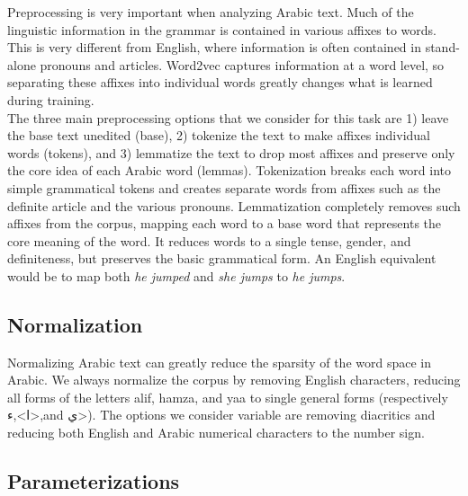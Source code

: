 Preprocessing is very important when analyzing Arabic text. Much of the linguistic information in the grammar is contained in various affixes to words. This is very different from English, where information is often contained in stand-alone pronouns and articles. Word2vec captures information at a word level, so separating these affixes into individual words greatly changes what is learned during training.
\\
The three main preprocessing options that we consider for this task are 1) leave the base text unedited (base), 2) tokenize the text to make affixes individual words (tokens), and 3) lemmatize the text to drop most affixes and preserve only the core idea of each Arabic word (lemmas). Tokenization breaks each word into simple grammatical tokens and creates separate words from affixes such as the definite article and the various pronouns. Lemmatization completely removes such affixes from the corpus, mapping each word to a base word that represents the core meaning of the word. It reduces words to a single tense, gender, and definiteness, but preserves the basic grammatical form. An English equivalent would be to map both \textit{he jumped} and \textit{she jumps} to \textit{he jumps}.

\subsection{Normalization}

Normalizing Arabic text can greatly reduce the sparsity of the word space in Arabic. We always normalize the corpus by removing English characters, reducing all forms of the letters alif, hamza, and yaa to single general forms (respectively \<ا>,\<ء>,and \<ي>).  The options we consider variable are removing diacritics and reducing both English and Arabic numerical characters to the number sign.

\subsection{Parameterizations}

